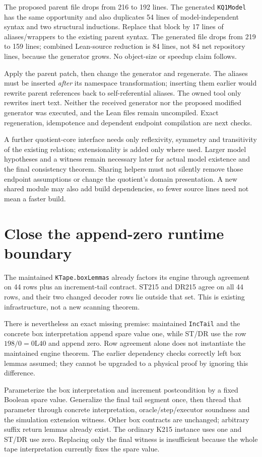 \documentclass[11pt]{article}
\begin{document}
The proposed parent file drops from 216 to 192 lines. The generated \texttt{KQ1Model} has the same opportunity and also duplicates 54 lines of model-independent syntax and two structural inductions. Replace that block by 17 lines of aliases/wrappers to the existing parent syntax. The generated file drops from 219 to 159 lines; combined Lean-source reduction is 84 lines, not 84 net repository lines, because the generator grows. No object-size or speedup claim follows.

Apply the parent patch, then change the generator and regenerate. The aliases must be inserted \emph{after} its namespace transformation; inserting them earlier would rewrite parent references back to self-referential aliases. The owned tool only rewrites inert text. Neither the received generator nor the proposed modified generator was executed, and the Lean files remain uncompiled. Exact regeneration, idempotence and dependent endpoint compilation are next checks.

A further quotient-core interface needs only reflexivity, symmetry and transitivity of the existing relation; extensionality is added only where used. Larger model hypotheses and a witness remain necessary later for actual model existence and the final consistency theorem. Sharing helpers must not silently remove those endpoint assumptions or change the quotient's domain presentation. A new shared module may also add build dependencies, so fewer source lines need not mean a faster build.

\section{Close the append-zero runtime boundary}
The maintained \texttt{KTape.boxLemmas} already factors its engine through agreement on 44 rows plus an increment-tail contract. ST215 and DR215 agree on all 44 rows, and their two changed decoder rows lie outside that set. This is existing infrastructure, not a new scanning theorem.

There is nevertheless an exact missing premise: maintained \texttt{IncTail} and the concrete box interpretation append spare value one, while ST/DR use the row $198/0=0\mathrm{L}40$ and append zero. Row agreement alone does not instantiate the maintained engine theorem. The earlier dependency checks correctly left box lemmas assumed; they cannot be upgraded to a physical proof by ignoring this difference.

Parameterize the box interpretation and increment postcondition by a fixed Boolean spare value. Generalize the final tail segment once, then thread that parameter through concrete interpretation, oracle/step/executor soundness and the simulation extension witness. Other box contracts are unchanged; arbitrary suffix return lemmas already exist. The ordinary K215 instance uses one and ST/DR use zero. Replacing only the final witness is insufficient because the whole tape interpretation currently fixes the spare value.
\end{document}

